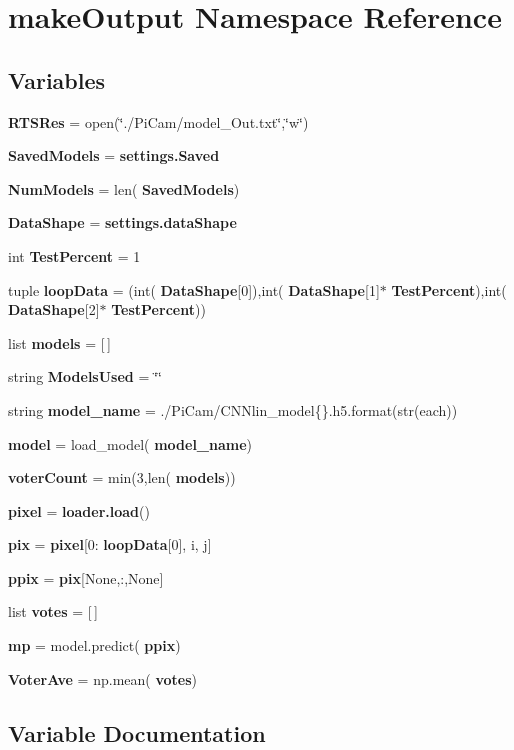 \section{make\+Output Namespace Reference}
\label{namespacemake_output}
\subsection*{Variables}
\begin{DoxyCompactItemize}
\item 
\textbf{ R\+T\+S\+Res} = open(\char`\"{}./Pi\+Cam/model\+\_\+\+Out.\+txt\char`\"{},\char`\"{}w\char`\"{})
\item 
\textbf{ Saved\+Models} = \textbf{ settings.\+Saved}
\item 
\textbf{ Num\+Models} = len(\textbf{ Saved\+Models})
\item 
\textbf{ Data\+Shape} = \textbf{ settings.\+data\+Shape}
\item 
int \textbf{ Test\+Percent} = 1
\item 
tuple \textbf{ loop\+Data} = (int(\textbf{ Data\+Shape}[0]),int(\textbf{ Data\+Shape}[1]$\ast$\textbf{ Test\+Percent}),int(\textbf{ Data\+Shape}[2]$\ast$\textbf{ Test\+Percent}))
\item 
list \textbf{ models} = [$\,$]
\item 
string \textbf{ Models\+Used} = \char`\"{}\char`\"{}
\item 
string \textbf{ model\+\_\+name} = \textquotesingle{}./Pi\+Cam/C\+N\+Nlin\+\_\+model\{\}.h5\textquotesingle{}.format(str(each))
\item 
\textbf{ model} = load\+\_\+model(\textbf{ model\+\_\+name})
\item 
\textbf{ voter\+Count} = min(3,len(\textbf{ models}))
\item 
\textbf{ pixel} = \textbf{ loader.\+load}()
\item 
\textbf{ pix} = \textbf{ pixel}[0\+:\textbf{ loop\+Data}[0], i, j]
\item 
\textbf{ ppix} = \textbf{ pix}[None,\+:,None]
\item 
list \textbf{ votes} = [$\,$]
\item 
\textbf{ mp} = model.\+predict(\textbf{ ppix})
\item 
\textbf{ Voter\+Ave} = np.\+mean(\textbf{ votes})
\end{DoxyCompactItemize}


\subsection{Variable Documentation}
\mbox{\label{namespacemake_output_a3ba9170953092ba8f3208a7d98b63b03}} 
